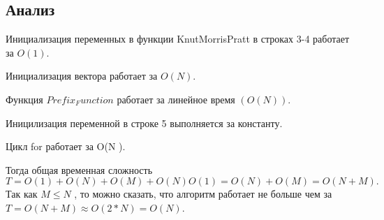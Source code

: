 \documentclass[bachelor, och, referat, times]{SCWorks}
\begin{document}
\subsection{Анализ}

Инициализация переменных в функции KnutMorrisPratt в строках 3-4 работает за $O(1)$.

 Инициализация вектора работает за $O(N )$.

Функция $Prefix_Function$ работает за линейное время $(O(N))$. 

Иницилизация переменной в строке 5 выполняется за константу.

Цикл for работает за O(N ).

Тогда общая временная сложность
$T = O(1) + O(N ) + O(M ) + O(N )O(1) = O(N ) + O(M ) = O(N + M ).$
Так как $M \leq  N$ , то можно сказать, 
что алгоритм работает не больше чем за $T = O(N + M ) \approx  O(2 * N ) = O(N )$.
    \appendix
     
\end{document}
